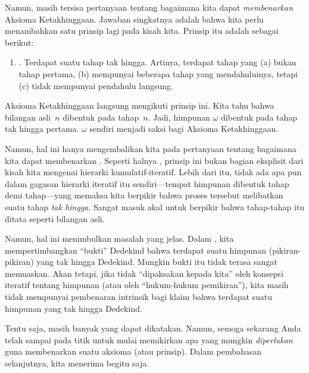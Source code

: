 \documentclass[../../../include/open-logic-section]{subfiles}
\begin{document}
Namun, masih tersisa pertanyaan tentang bagaimana kita dapat
\emph{membenarkan} Aksioma Ketakhinggaan. Jawaban singkatnya adalah bahwa kita
perlu menambahkan satu prinsip lagi pada kisah kita. Prinsip itu adalah
sebagai berikut:
\begin{enumerate}
	\item[] \stagesinf. Terdapat suatu tahap tak hingga. Artinya, terdapat
	tahap yang (a) bukan tahap pertama, (b) mempunyai beberapa tahap yang
	mendahuluinya, tetapi (c) tidak mempunyai pendahulu langsung.
\end{enumerate}
Aksioma Ketakhinggaan langsung mengikuti prinsip ini. Kita tahu bahwa
bilangan asli~$n$ dibentuk pada tahap~$n$. Jadi, himpunan $\omega$ dibentuk
pada tahap tak hingga pertama. $\omega$ sendiri menjadi saksi bagi Aksioma
Ketakhinggaan.

Namun, hal ini hanya mengembalikan kita pada pertanyaan tentang bagaimana
kita dapat membenarkan \stagesinf. Seperti halnya \stagessucc, prinsip ini
bukan bagian eksplisit dari kisah kita mengenai hierarki kumulatif-iteratif.
Lebih dari itu, tidak ada apa pun dalam gagasan hierarki iteratif itu
sendiri---tempat himpunan dibentuk tahap demi tahap---yang memaksa kita
berpikir bahwa proses tersebut melibatkan suatu tahap \emph{tak hingga}.
Sangat masuk akal untuk berpikir bahwa tahap-tahap itu ditata seperti
bilangan asli.

Namun, hal ini menimbulkan masalah yang jelas. Dalam
, kita mempertimbangkan ``bukti''
Dedekind bahwa terdapat suatu himpunan (pikiran-pikiran) yang tak hingga
Dedekind. Mungkin bukti itu tidak terasa sangat memuaskan. Akan tetapi, jika
\stagesinf{} tidak ``dipaksakan kepada kita'' oleh konsepsi iteratif tentang
himpunan (atau oleh ``hukum-hukum pemikiran''), kita masih tidak mempunyai
pembenaran intrinsik bagi klaim bahwa terdapat suatu himpunan yang tak hingga
Dedekind.

Tentu saja, masih banyak yang dapat dikatakan. Namun, semoga sekarang Anda
telah sampai pada titik untuk mulai memikirkan apa yang mungkin
\emph{diperlukan} guna membenarkan suatu aksioma (atau prinsip). Dalam
pembahasan selanjutnya, kita menerima \stagesinf{} begitu saja.
\end{document}
